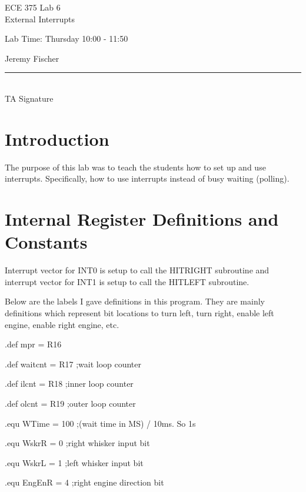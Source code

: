 \documentclass[12pt,letterpaper]{article}
\begin{document}
\begin{titlepage}
    \vspace*{4cm}
    \begin{flushright}
    {\huge
        ECE 375 Lab 6\\[1cm]
    }
    {\large
        External Interrupts
    }
    \end{flushright}
    \begin{flushleft}
    Lab Time: Thursday  10:00 - 11:50
    \end{flushleft}
    \begin{flushright}
    Jeremy Fischer

    \vfill
    \rule{5in}{.5mm}\\
    TA Signature
    \end{flushright}

\end{titlepage}

\section{Introduction}
	The purpose of this lab was to teach the students how to set up and use interrupts.
	Specifically, how to use interrupts instead of busy waiting (polling).

\section{Internal Register Definitions and Constants}
	Interrupt vector for INT0 is setup to call the  HITRIGHT subroutine and interrupt vector for INT1 is setup to call the  HITLEFT subroutine. 
	
	Below are the labels I gave definitions in this program.
	They are mainly definitions which represent bit locations to turn left, turn right, enable left engine, enable right engine, etc.
	
	.def  mpr = R16
	
	.def  waitcnt = R17					\hfill	;wait loop counter
	
	.def  ilcnt = R18					\hfill	;inner loop counter
	
	.def  olcnt = R19					\hfill	;outer loop counter
	
	.equ  WTime = 100					\hfill	;(wait time in MS) / 10ms. So 1s
	
	.equ  WskrR = 0						\hfill	;right whisker input bit
	
	.equ  WskrL = 1						\hfill	;left whisker input bit
	
	.equ  EngEnR = 4					\hfill	;right engine direction bit
	
\end{document}
